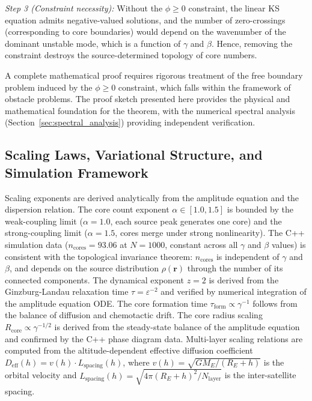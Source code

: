 \documentclass[sn-nature,pdflatex]{sn-jnl}
\begin{document}
\noindent\textit{Step 3 (Constraint necessity):} Without the $\phi \ge 0$ constraint, the linear KS equation admits negative-valued solutions, and the number of zero-crossings (corresponding to core boundaries) would depend on the wavenumber of the dominant unstable mode, which is a function of $\gamma$ and $\beta$. Hence, removing the constraint destroys the source-determined topology of core numbers.

A complete mathematical proof requires rigorous treatment of the free boundary problem induced by the $\phi \ge 0$ constraint, which falls within the framework of obstacle problems. The proof sketch presented here provides the physical and mathematical foundation for the theorem, with the numerical spectral analysis (Section~\ref{sec:spectral_analysis}) providing independent verification.

\subsection{Scaling Laws, Variational Structure, and Simulation Framework}

Scaling exponents are derived analytically from the amplitude equation and the dispersion relation. The core count exponent $\alpha \in [1.0, 1.5]$ is bounded by the weak-coupling limit ($\alpha = 1.0$, each source peak generates one core) and the strong-coupling limit ($\alpha = 1.5$, cores merge under strong nonlinearity). The C++ simulation data ($n_{\text{cores}} = 93.06$ at $N=1000$, constant across all $\gamma$ and $\beta$ values) is consistent with the topological invariance theorem: $n_{\text{cores}}$ is independent of $\gamma$ and $\beta$, and depends on the source distribution $\rho(\mathbf{r})$ through the number of its connected components. The dynamical exponent $z = 2$ is derived from the Ginzburg-Landau relaxation time $\tau = \varepsilon^{-2}$ and verified by numerical integration of the amplitude equation ODE. The core formation time $\tau_{\text{form}} \propto \gamma^{-1}$ follows from the balance of diffusion and chemotactic drift. The core radius scaling $R_{\text{core}} \propto \gamma^{-1/2}$ is derived from the steady-state balance of the amplitude equation and confirmed by the C++ phase diagram data. Multi-layer scaling relations are computed from the altitude-dependent effective diffusion coefficient $D_{\text{eff}}(h) = v(h) \cdot L_{\text{spacing}}(h)$, where $v(h) = \sqrt{GM_E/(R_E + h)}$ is the orbital velocity and $L_{\text{spacing}}(h) = \sqrt{4\pi(R_E + h)^2 / N_{\text{layer}}}$ is the inter-satellite spacing.
\end{document}
